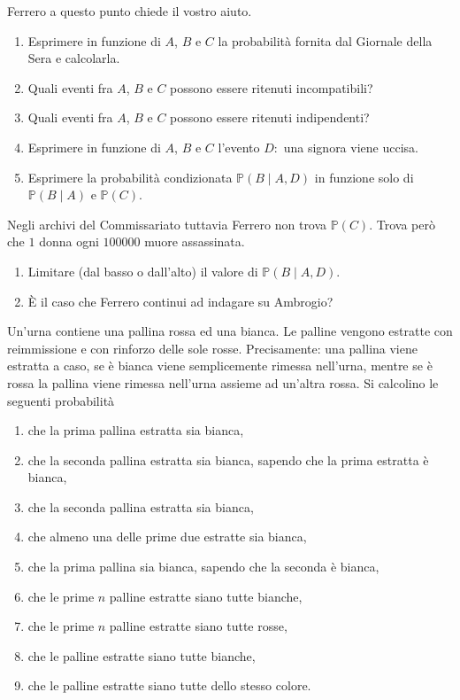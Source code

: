 Ferrero a questo punto chiede il vostro aiuto.
\begin{enumerate}
\item Esprimere in funzione di $A$, $B$ e $C$ la probabilità fornita dal Giornale della Sera e calcolarla.
\item Quali eventi fra $A$, $B$ e $C$ possono essere ritenuti incompatibili?
\item Quali eventi fra $A$, $B$ e $C$ possono essere ritenuti indipendenti?
\item Esprimere in funzione di $A$, $B$ e $C$ l'evento $D:$ una signora viene uccisa.
\item Esprimere la probabilità condizionata $\mathbb{P}( B\mid A,D)$ in funzione solo di $\mathbb{P}( B\mid A)$ e $\mathbb{P}( C)$.
\end{enumerate}

Negli archivi del Commissariato tuttavia Ferrero non trova $\mathbb{P}( C)$. Trova però che $1$ donna ogni $100000$ muore assassinata.
\begin{enumerate}
\item Limitare (dal basso o dall'alto) il valore di $\mathbb{P}( B\mid A,D)$.
\item È il caso che Ferrero continui ad indagare su Ambrogio?
\end{enumerate}

Un'urna contiene una pallina rossa ed una bianca. Le palline vengono estratte con reimmissione e con rinforzo delle sole rosse. Precisamente: una pallina viene estratta a caso, se è bianca viene semplicemente rimessa nell'urna, mentre se è rossa la pallina viene rimessa nell'urna assieme ad un'altra rossa. Si calcolino le seguenti probabilità
\begin{enumerate}
\item che la prima pallina estratta sia bianca,
\item che la seconda pallina estratta sia bianca, sapendo che la prima estratta è bianca,
\item che la seconda pallina estratta sia bianca,
\item che almeno una delle prime due estratte sia bianca,
\item che la prima pallina sia bianca, sapendo che la seconda è bianca,
\item che le prime $n$ palline estratte siano tutte bianche,
\item che le prime $n$ palline estratte siano tutte rosse,
\item che le palline estratte siano tutte bianche,
\item che le palline estratte siano tutte dello stesso colore.
\end{enumerate}
\Esercizio{}

